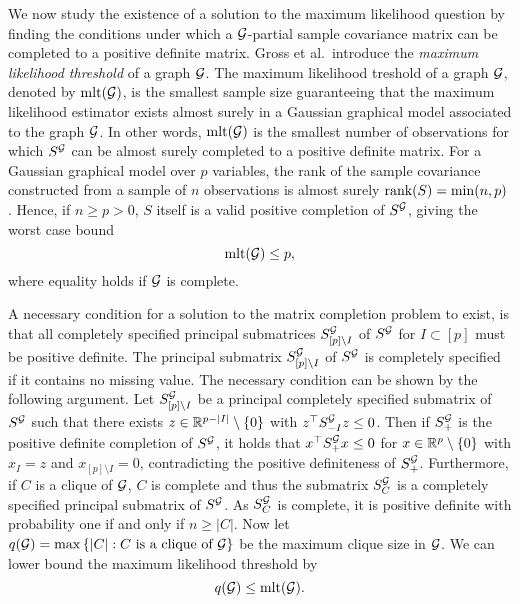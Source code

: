 We now study the existence of a solution to the maximum likelihood question by finding the conditions under which a ${\mathcal{G}}$-partial sample covariance matrix can be completed to a positive definite matrix. Gross et al.\,\cite{10.3150/16-BEJ881} introduce the \textit{maximum likelihood threshold} of a graph ${\mathcal{G}}$. The maximum likelihood treshold of a graph ${\mathcal{G}}$, denoted by ${\textrm{mlt}}({\mathcal{G}})$, is the smallest sample size guaranteeing that the maximum likelihood estimator exists almost surely in a Gaussian graphical model associated to the graph ${\mathcal{G}}$. In other words, ${\textrm{mlt}}({\mathcal{G}})$ is the smallest number of observations for which $S^{\mathcal{G}}$ can be almost surely completed to a positive definite matrix. For a Gaussian graphical model over $p$ variables, the rank of the sample covariance constructed from a sample of $n$ observations is almost surely ${\textrm{rank}}(S) = \min(n, p)$. Hence, if $n \geq p > 0$, $S$ itself is a valid positive completion of $S^{\mathcal{G}}$, giving the worst case bound
\begin{equation} \label{eq-pessimistic-mlt}
    {\textrm{mlt}}({\mathcal{G}}) \leq p,
\end{equation}
where equality holds if ${\mathcal{G}}$ is complete.

A necessary condition for a solution to the matrix completion problem to exist, is that all completely specified principal submatrices $S^{\mathcal{G}}_{[p]\setminus I}$ of $S^{\mathcal{G}}$ for $I \subset [p]$ must be positive definite. The principal submatrix $S^{\mathcal{G}}_{[p]\setminus I}$ of $S^{\mathcal{G}}$ is completely specified if it contains no missing value. The necessary condition can be shown by the following argument. Let $S^{\mathcal{G}}_{[p]\setminus I}$ be a principal completely specified submatrix of $S^{\mathcal{G}}$ such that there exists $z \in \mathbb{R}^{p-|I|}\setminus {\left\{0\right\}}$ with $z^\top S^{\mathcal{G}}_{-I} z \leq 0$. Then if $S^{\mathcal{G}}_+$ is the positive definite completion of $S^{\mathcal{G}}$, it holds that $x^\top S^{\mathcal{G}}_+ x \leq 0$ for $x \in \mathbb{R}^p \setminus {\left\{0\right\}}$ with $x_I = z$ and $x_{[p]\setminus I} = 0$, contradicting the positive definiteness of $S^{\mathcal{G}}_+$. Furthermore, if $C$ is a clique of ${\mathcal{G}}$, $C$ is complete and thus the submatrix $S^{\mathcal{G}}_C$ is a completely specified principal submatrix of $S^{\mathcal{G}}$. As $S^{\mathcal{G}}_C$ is complete, it is positive definite with probability one if and only if $n \geq |C|$. Now let $q({\mathcal{G}}) = \max {\left\{|C| : C {\textrm{ is a clique of }} {\mathcal{G}}\right\}}$ be the maximum clique size in ${\mathcal{G}}$. We can  lower bound the maximum likelihood threshold by
\begin{equation} \label{eq-mlt-upper-bound}
    q({\mathcal{G}}) \leq {\textrm{mlt}}({\mathcal{G}}).
\end{equation}

